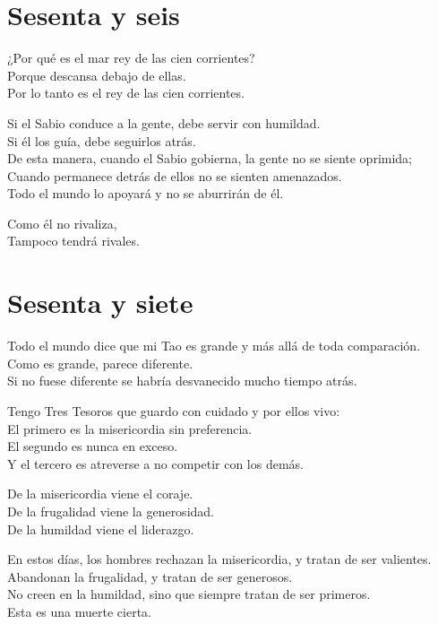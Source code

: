 \documentclass[hidelinks]{memoir}
\begin{document}
	\chapter*{Sesenta y seis}
	
	¿Por qué es el mar rey de las cien corrientes?\\
	Porque descansa debajo de ellas.\\
	Por lo tanto es el rey de las cien corrientes.
	
	Si el Sabio conduce a la gente, debe servir con humildad.\\
	Si él los guía, debe seguirlos atrás.\\
	De esta manera, cuando el Sabio gobierna, la gente no se siente
	oprimida;\\
	Cuando permanece detrás de ellos no se sienten amenazados.\\
	Todo el mundo lo apoyará y no se aburrirán de él.
	
	Como él no rivaliza,\\
	Tampoco tendrá rivales.
	
	\chapter*{Sesenta y siete}
	
	Todo el mundo dice que mi Tao es grande y más allá de toda
	comparación.\\
	Como es grande, parece diferente.\\
	Si no fuese diferente se habría desvanecido mucho tiempo atrás.
	
	Tengo Tres Tesoros que guardo con cuidado y por ellos vivo:\\
	El primero es la misericordia sin preferencia.\\
	El segundo es nunca en exceso.\\
	Y el tercero es atreverse a no competir con los demás.
	
	De la misericordia viene el coraje.\\
	De la frugalidad viene la generosidad.\\
	De la humildad viene el liderazgo.
	
	En estos días, los hombres rechazan la misericordia, y tratan de ser
	valientes.\\
	Abandonan la frugalidad, y tratan de ser generosos.\\
	No creen en la humildad, sino que siempre tratan de ser primeros.\\
	Esta es una muerte cierta.
	
\end{document}
